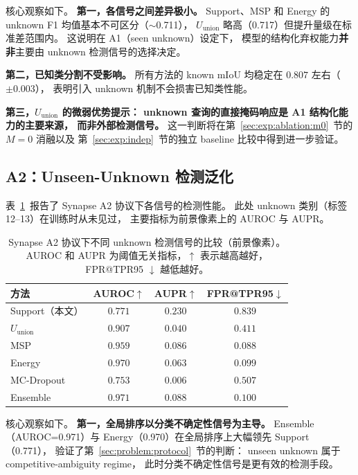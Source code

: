 \documentclass[3p,twocolumn,authoryear]{elsarticle}
\begin{document}
核心观察如下。
\textbf{第一，各信号之间差异极小。}
Support、MSP 和 Energy 的 unknown F1 均值基本不可区分（$\sim$0.711），
$U_{\text{union}}$ 略高（0.717）但提升量级在标准差范围内。
这说明在 A1（seen unknown）设定下，
模型的结构化弃权能力\textbf{并非}主要由 unknown 检测信号的选择决定。

\textbf{第二，已知类分割不受影响。}
所有方法的 known mIoU 均稳定在 $0.807$ 左右（$\pm 0.003$），
表明引入 unknown 机制不会损害已知类性能。

\textbf{第三，$U_{\text{union}}$ 的微弱优势提示：
unknown 查询的直接掩码响应是 A1 结构化能力的主要来源，
而非外部检测信号。}
这一判断将在第~\ref{sec:exp:ablation:m0}~节的 $M=0$ 消融以及
第~\ref{sec:exp:indep}~节的独立 baseline 比较中得到进一步验证。

\subsection{A2：Unseen-Unknown 检测泛化}\label{sec:exp:a2}

表~\ref{tab:a2_main}~报告了 Synapse A2 协议下各信号的检测性能。
此处 unknown 类别（标签 12--13）在训练时从未见过，
主要指标为前景像素上的 AUROC 与 AUPR。

\begin{table}[t]
\centering
\caption{Synapse A2 协议下不同 unknown 检测信号的比较（前景像素）。
AUROC 和 AUPR 为阈值无关指标，$\uparrow$ 表示越高越好，FPR@TPR95 $\downarrow$ 越低越好。}\label{tab:a2_main}
\begin{tabular}{lccc}
\toprule
方法 & AUROC$\uparrow$ & AUPR$\uparrow$ & FPR@TPR95$\downarrow$ \\
\midrule
Support（本文） & $0.771$ & $\mathbf{0.230}$ & $0.839$ \\
$U_{\text{union}}$     & $0.907$ & $0.040$ & $0.411$ \\
MSP                    & $0.959$ & $0.086$ & $0.088$ \\
Energy                 & $0.970$ & $0.063$ & $0.099$ \\
MC-Dropout             & $0.753$ & $0.006$ & $0.507$ \\
Ensemble               & $\mathbf{0.971}$ & $0.088$ & $\mathbf{0.100}$ \\
\bottomrule
\end{tabular}
\end{table}

核心观察如下。
\textbf{第一，全局排序以分类不确定性信号为主导。}
Ensemble（AUROC=0.971）与 Energy（0.970）在全局排序上大幅领先 Support（0.771），
验证了第~\ref{sec:problem:protocol}~节的判断：
unseen unknown 属于 competitive-ambiguity regime，
此时分类不确定性信号是更有效的检测手段。
\end{document}
